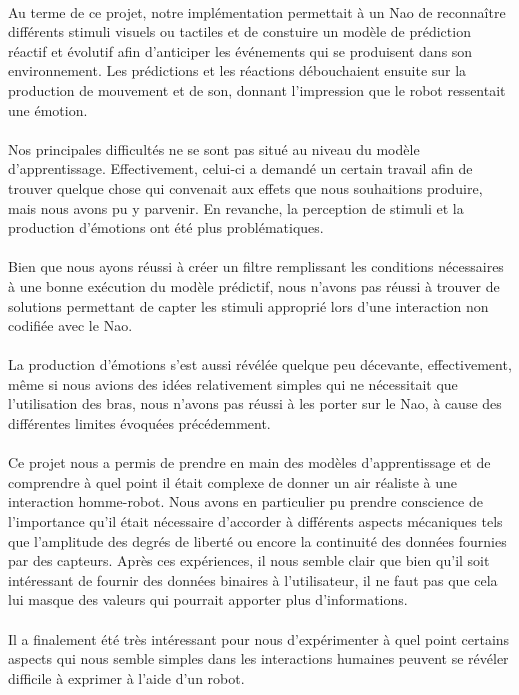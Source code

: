 \paragraph{}
Au terme de ce projet, notre implémentation permettait à un Nao de
reconnaître différents stimuli visuels ou tactiles et de constuire un
modèle de prédiction réactif et évolutif afin d'anticiper les événements qui
se produisent dans son environnement. Les prédictions et les réactions
débouchaient ensuite sur la production de mouvement et de son, donnant
l'impression que le robot ressentait une émotion.

\paragraph{}
Nos principales difficultés ne se sont pas situé au niveau du modèle
d'apprentissage. Effectivement, celui-ci a demandé un certain travail afin
de trouver quelque chose qui convenait aux effets que nous souhaitions
produire, mais nous avons pu y parvenir. En revanche, la perception de
stimuli et la production d'émotions ont été plus problématiques. 

\paragraph{}
Bien que nous ayons réussi à créer un filtre remplissant les conditions
nécessaires à une bonne exécution du modèle prédictif, nous n'avons pas
réussi à trouver de solutions permettant de capter les stimuli approprié
lors d'une interaction non codifiée avec le Nao.

\paragraph{}
La production d'émotions s'est aussi révélée quelque peu décevante,
effectivement, même si nous avions des idées relativement simples qui ne
nécessitait que l'utilisation des bras, nous n'avons pas réussi à les porter
sur le Nao, à cause des différentes limites évoquées précédemment.

\paragraph{}
Ce projet nous a permis de prendre en main des modèles d'apprentissage et
de comprendre à quel point il était complexe de donner un air réaliste à une
interaction homme-robot. Nous avons en particulier pu prendre conscience de
l'importance qu'il était nécessaire d'accorder à différents aspects
mécaniques tels que l'amplitude des degrés de liberté ou encore la
continuité des données fournies par des capteurs. Après ces expériences, il
nous semble clair que bien qu'il soit intéressant de fournir des données
binaires à l'utilisateur, il ne faut pas que cela lui masque des valeurs qui
pourrait apporter plus d'informations.

\paragraph{}
Il a finalement été très intéressant pour nous d'expérimenter à quel point
certains aspects qui nous semble simples dans les interactions humaines
peuvent se révéler difficile à exprimer à l'aide d'un robot.
